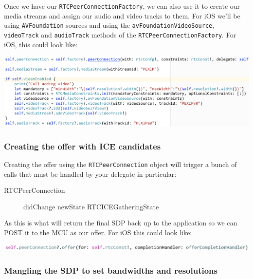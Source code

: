 \documentclass[a4paper,11pt]{article}
\begin{document}
\label{orgtarget7}

Once we have our \texttt{RTCPeerConnectionFactory}, we can also use it to
create our media streams and assign our audio and video tracks to
them.  For iOS we'll be using \texttt{AVFoundation} sources and using the
\texttt{avFoundationVideoSource}, \texttt{videoTrack} and \texttt{audioTrack} methods of
the \texttt{RTCPeerConnectionFactory}.  For iOS, this could look like:

\includegraphics[width=.9\linewidth]{./images/add_tracks.png}

\subsubsection{Creating the offer with ICE candidates}
\label{sec:orgheadline22}

Creating the offer using the \texttt{RTCPeerConnection} object will trigger a
bunch of calls that must be handled by your delegate in particular:

\begin{description}
\item[{RTCPeerConnection}] didChange newState RTCICEGatheringState
\end{description}

As this is what will return the final SDP back up to the application
so we can POST it to the MCU as our offer.  For iOS this could look like:

\includegraphics[width=.9\linewidth]{./images/peer_conn_offer.png}

\subsubsection{Mangling the SDP to set bandwidths and resolutions}
\label{sec:orgheadline23}
\end{document}
